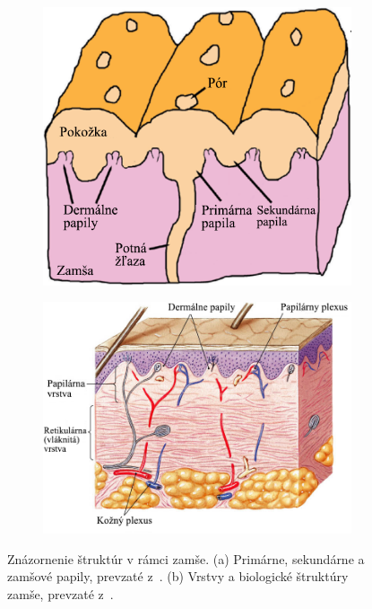   \begin{figure}[h]\centering
    \centering
    \begin{subfigure}[b]{0.44\linewidth}
      \includegraphics[width=\linewidth]{obrazky-figures/papily_prierez.png}
      \caption{}
      \label{obr:zamsa_a_papily/papily_prierez}
    \end{subfigure}
    \hfill
    \begin{subfigure}[b]{0.54\linewidth}
      \includegraphics[width=\linewidth]{obrazky-figures/zamsa.png}
      \caption{}
      \label{obr:zamsa_a_papily/zamsa}
    \end{subfigure}
    \caption{Znázornenie štruktúr v rámci zamše.
              (a) Primárne, sekundárne a zamšové papily, prevzaté z~{\cite{FingerprintSrcBook}}.
              (b) Vrstvy a biologické štruktúry zamše, prevzaté z~{\cite{droual_dermis}}.}
    \label{obr:zamsa_a_papily}
  \end{figure}
  
